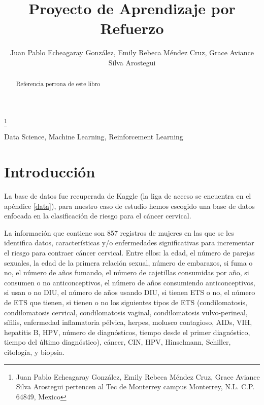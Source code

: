 \documentclass[journal]{IEEEtran}
\title{\LARGE \bf Proyecto de Aprendizaje por Refuerzo}
\author{Juan Pablo Echeagaray González, Emily Rebeca Méndez Cruz, Grace Aviance Silva Arostegui}%
\begin{document}
    \thanks{Juan Pablo Echeagaray González, Emily Rebeca Méndez Cruz, Grace Aviance Silva Arostegui pertencen al Tec de Monterrey campus Monterrey, N.L. C.P. 64849, Mexico {\tt\small}}

    \maketitle

    \thispagestyle{empty}
    \pagestyle{empty}
    
    \begin{abstract}
        Referencia perrona de este libro \cite{russell2002artificial}
    \end{abstract}

    \begin{IEEEkeywords} 
    Data Science, Machine Learning, Reinforcement Learning
    \end{IEEEkeywords}

    \section{Introducción} \label{introduction}

        La base de datos fue recuperada de Kaggle (la liga de acceso se encuentra en el apéndice \ref{data}), para nuestro caso de estudio hemos escogido una base de datos enfocada en la clasificación de riesgo para el cáncer cervical.

        La información que contiene son  857 registros de mujeres en las que se les identifica datos, características y/o enfermedades significativas para incrementar el riesgo para contraer cáncer cervical. Entre ellos: la edad, el número de parejas sexuales, la edad de la primera relación sexual, número de embarazos, si fuma o no, el número de años fumando, el número de cajetillas consumidas por año, si consumen o no anticonceptivos, el número de años consumiendo anticonceptivos, si usan o no DIU, el número de años usando DIU, si tienen ETS o no, el número de ETS que tienen, si tienen o no los siguientes tipos de ETS (condilomatosis, condilomatosis cervical, condilomatosis vaginal, condilomatosis vulvo-perineal, sífilis, enfermedad inflamatoria pélvica, herpes, molusco contagioso, AIDs, VIH, hepatitis B, HPV, número de diagnósticos, tiempo desde el primer diagnóstico, tiempo del último diagnóstico), cáncer, CIN, HPV, Hinselmann, Schiller, citología, y biopsia.
\end{document}
